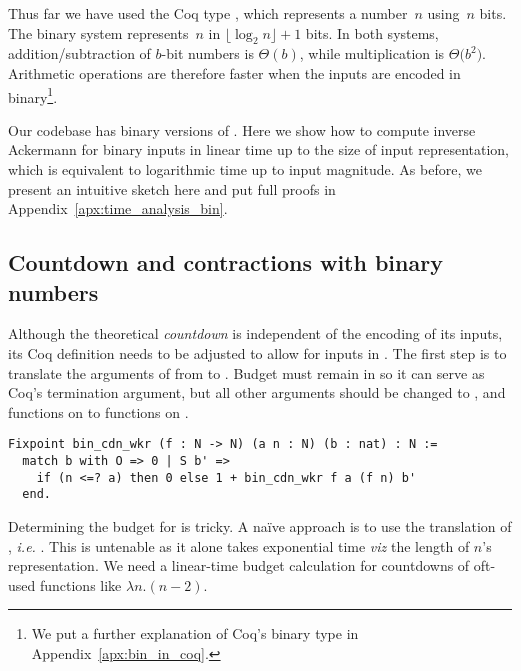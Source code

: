 
Thus far we have used the Coq type , which represents 
a number~$n$ using~$n$ bits. 
The binary system represents~$n$ in $\lfloor \log_{2} n \rfloor + 1$ bits.
In both systems, addition/subtraction of $b$-bit 
numbers is $\Theta(b)$, while multiplication is $\Theta \big(b^2\big)$. 
Arithmetic operations are therefore faster when the inputs 
are encoded in binary\footnote{We put a further explanation of 
Coq's binary type  in Appendix~\ref{apx:bin_in_coq}.}.

Our codebase has binary versions of . 
Here we show how to compute inverse Ackermann for binary inputs in 
linear time up to the size of input representation, 
which is equivalent to logarithmic time up to input magnitude.
As before, we present an intuitive sketch here and put 
full proofs in Appendix~\ref{apx:time_analysis_bin}.

\subsection{Countdown and contractions with binary numbers}

Although the theoretical \emph{countdown} is independent of the encoding 
of its inputs, its Coq definition needs to be adjusted to allow for inputs 
in . The first step is to translate the arguments of 
 from  to . Budget  must 
remain in  so it can serve as Coq's termination argument, 
but all other  arguments should be changed 
to , and functions on  to functions on .
\begin{lstlisting}
Fixpoint bin_cdn_wkr (f : N -> N) (a n : N) (b : nat) : N :=
  match b with O => 0 | S b' => 
    if (n <=? a) then 0 else 1 + bin_cdn_wkr f a (f n) b'
  end.
\end{lstlisting}

Determining the budget for  is tricky. 
A naïve approach is to use the  translation of , 
\emph{i.e.} . This is untenable as it alone 
takes exponential time \emph{viz} the length of $n$'s representation.
We need a linear-time budget calculation for countdowns 
of oft-used functions like $\lambda n.(n-2)$.


